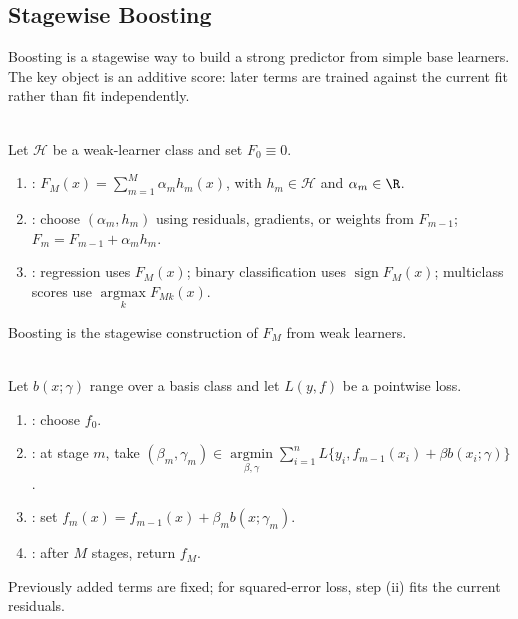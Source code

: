 \subsection{Stagewise Boosting}
Boosting is a stagewise way to build a strong predictor from simple base learners.  The key object is an additive score: later terms are trained against the current fit rather than fit independently.

\begin{definition} \label{def:sl-boosting} \\
Let $\mathcal H$ be a weak-learner class and set $F_0\equiv0$.
\begin{enumerate}[label=(\roman*)]
\setlength{\itemsep}{0pt}
\item {}: $F_M(x)=\sum\limits_{m=1}^M\alpha_m h_m(x)$, with $h_m\in\mathcal H$ and $\alpha_m\in\R$.
\item {}: choose $(\alpha_m,h_m)$ using residuals, gradients, or weights from $F_{m-1}$; $F_m=F_{m-1}+\alpha_mh_m$.
\item {}: regression uses $F_M(x)$; binary classification uses $\operatorname{sign}F_M(x)$; multiclass scores use $\operatorname*{argmax}\limits_k F_{Mk}(x)$.
\end{enumerate}
Boosting is the stagewise construction of $F_M$ from weak learners.
\end{definition}

\begin{method} \label{meth:sl-forward-stagewise-additive-modeling} \\
Let $b(x;\gamma)$ range over a basis class and let $L(y,f)$ be a pointwise loss.
\begin{enumerate}[label=(\roman*)]
\setlength{\itemsep}{0pt}
\item {}: choose $f_0$.
\item {}: at stage $m$, take $(\beta_m,\gamma_m)\in\operatorname*{argmin}\limits_{\beta,\gamma}\sum\limits_{i=1}^n L\{y_i,f_{m-1}(x_i)+\beta b(x_i;\gamma)\}$.
\item {}: set $f_m(x)=f_{m-1}(x)+\beta_m b(x;\gamma_m)$.
\item {}: after $M$ stages, return $f_M$.
\end{enumerate}
Previously added terms are fixed; for squared-error loss, step (ii) fits the current residuals.
\end{method}

